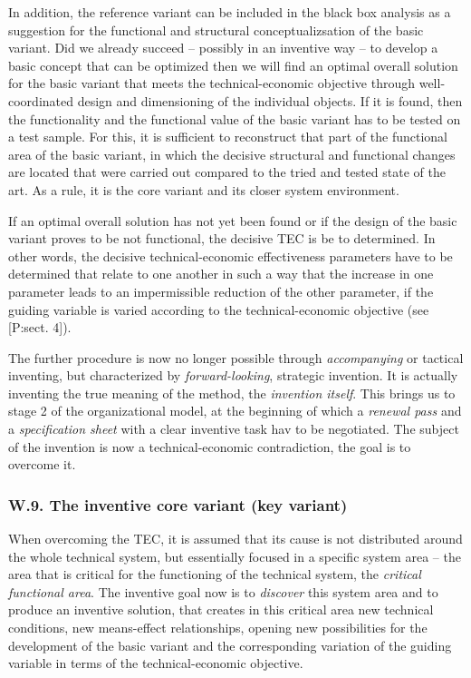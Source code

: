 \documentclass[11pt,a4paper]{article}
\begin{document}
In addition, the reference variant can be included in the black box analysis
as a suggestion for the functional and structural conceptualizsation of the
basic variant. Did we already succeed -- possibly in an inventive way -- to
develop a basic concept that can be optimized then we will find an optimal
overall solution for the basic variant that meets the technical-economic
objective through well-coordinated design and dimensioning of the individual
objects. If it is found, then the functionality and the functional value of
the basic variant has to be tested on a test sample.  For this, it is
sufficient to reconstruct that part of the functional area of the basic
variant, in which the decisive structural and functional changes are located
that were carried out compared to the tried and tested state of the art. As a
rule, it is the core variant and its closer system environment.

If an optimal overall solution has not yet been found or if the design of the
basic variant proves to be not functional, the decisive TEC is be to
determined.  In other words, the decisive technical-economic effectiveness
parameters have to be determined that relate to one another in such a way that
the increase in one parameter leads to an impermissible reduction of the other
parameter, if the guiding variable is varied according to the
technical-economic objective (see [P:sect. 4]).

The further procedure is now no longer possible through \emph{accompanying} or
tactical inventing, but characterized by \emph{forward-looking}, strategic
invention. It is actually inventing the true meaning of the method, the
\emph{invention itself}. This brings us to stage 2 of the organizational
model, at the beginning of which a \emph{renewal pass} and a
\emph{specification sheet} with a clear inventive task hav to be negotiated.
The subject of the invention is now a technical-economic contradiction, the
goal is to overcome it.

\subsubsection*{W.9. The inventive core variant (key variant)}

When overcoming the TEC, it is assumed that its cause is not distributed
around the whole technical system, but essentially focused in a specific
system area -- the area that is critical for the functioning of the technical
system, the \emph{critical functional area}. The inventive goal now is to
\emph{discover} this system area and to produce an inventive solution, that
creates in this critical area new technical conditions, new means-effect
relationships, opening new possibilities for the development of the basic
variant and the corresponding variation of the guiding variable in terms of
the technical-economic objective.
\end{document}
